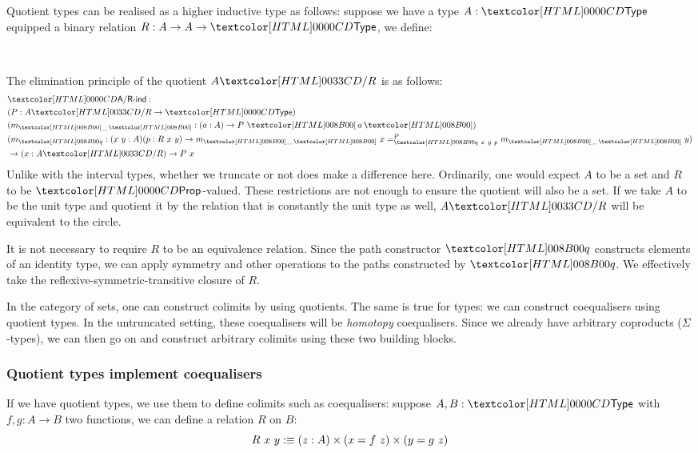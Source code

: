 Quotient types can be realised as a higher inductive type as follows:
suppose we have a type $A : \Type$ equipped a binary relation
$R : A \to A \to \Type$, we define:
%
\begin{datatype}{}{\Type}
   \\
\end{datatype}
%
The elimination principle of the quotient $\quotty{A}{R}$ is as
follows:
%
\begin{align*}
&\quotind{A}{R} : \\
&(P : \quotty{A}{R} \to \Type) \\
&(m_{\quotproj{\_}} : (a : A) \to P\ \quotproj{a}) \\
&(m_{\quoteq} : (x\ y : A) (p : R\ x\ y) \to \pathover{P}{\quoteq\ x\ y\ p}{m_{\quotproj{\_}}\ x}{m_{\quotproj{\_}}\ y})\\
&\to (x : \quotty{A}{R}) \to P\ x
\end{align*}
%
Unlike with the interval types, whether we truncate or not does make a
difference here. Ordinarily, one would expect $A$ to be a set and $R$
to be $\Prop$-valued. These restrictions are not enough to ensure the
quotient will also be a set. If we take $A$ to be the unit type and
quotient it by the relation that is constantly the unit type as well,
$\quotty{A}{R}$ will be equivalent to the circle.

It is not necessary to require $R$ to be an equivalence
relation. Since the path constructor $\quoteq$ constructs elements of
an identity type, we can apply symmetry and other operations to the
paths constructed by $\quoteq$. We effectively take the
reflexive-symmetric-transitive closure of $R$.

In the category of sets, one can construct colimits by using
quotients. The same is true for types: we can construct coequalisers
using quotient types. In the untruncated setting, these coequalisers
will be \emph{homotopy} coequalisers. Since we already have arbitrary
coproducts ($\Sigma$-types), we can then go on and construct arbitrary
colimits using these two building blocks.

\subsubsection{Quotient types implement coequalisers}
If we have quotient types, we use them to define colimits such as
coequalisers: suppose $A, B : \Type$ with $f, g : A \to B$ two
functions, we can define a relation $R$ on $B$:
$$
R\ x\ y :\equiv (z : A) \times (x = f\ z) \times (y = g\ z)
$$

